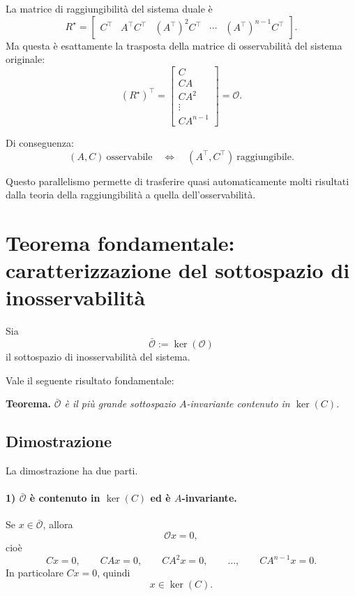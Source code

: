 La matrice di raggiungibilità del sistema duale è
\[
R^\star=
\begin{bmatrix}
C^\top & A^\top C^\top & (A^\top)^2 C^\top & \cdots & (A^\top)^{n-1}C^\top
\end{bmatrix}.
\]
Ma questa è esattamente la trasposta della matrice di osservabilità del sistema originale:
\[
(R^\star)^\top=
\begin{bmatrix}
C\\
CA\\
CA^2\\
\vdots\\
CA^{n-1}
\end{bmatrix}
=
\mathcal O.
\]

Di conseguenza:
\[
\boxed{
(A,C)\ \text{osservabile}
\quad \Longleftrightarrow \quad
(A^\top,C^\top)\ \text{raggiungibile}.
}
\]

Questo parallelismo permette di trasferire quasi automaticamente molti risultati dalla teoria della raggiungibilità a quella dell'osservabilità.

\section{Teorema fondamentale: caratterizzazione del sottospazio di inosservabilità}

Sia
\[
\bar{\mathcal O}:=\ker(\mathcal O)
\]
il sottospazio di inosservabilità del sistema.

Vale il seguente risultato fondamentale:

\medskip

\noindent
\textbf{Teorema.}
\emph{
\(\bar{\mathcal O}\) è il più grande sottospazio \(A\)-invariante contenuto in \(\ker(C)\).
}

\subsection*{Dimostrazione}

La dimostrazione ha due parti.

\paragraph{1) \(\bar{\mathcal O}\) è contenuto in \(\ker(C)\) ed è \(A\)-invariante.}

Se \(x\in\bar{\mathcal O}\), allora
\[
\mathcal O x=0,
\]
cioè
\[
Cx=0,\qquad CAx=0,\qquad CA^2x=0,\qquad \dots,\qquad CA^{n-1}x=0.
\]
In particolare \(Cx=0\), quindi
\[
x\in\ker(C).
\]

